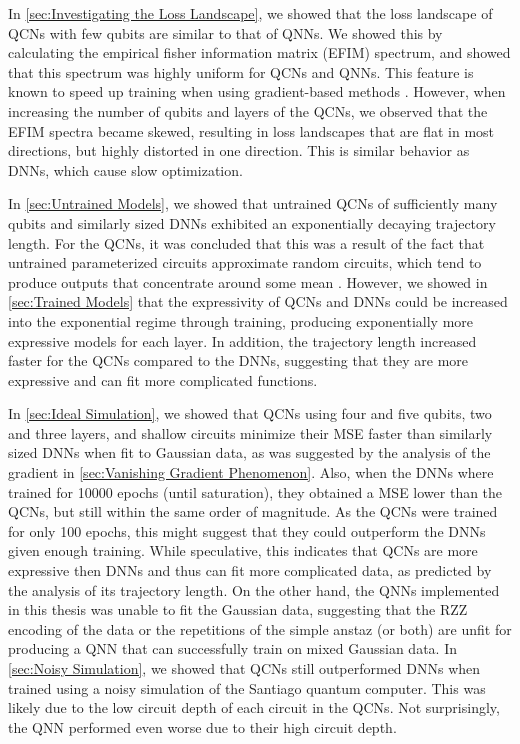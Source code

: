 In \cref{sec:Investigating the Loss Landscape}, we showed that the loss landscape of QCNs with few qubits are similar to that of QNNs. We showed this by calculating the empirical fisher information matrix (EFIM) spectrum, and showed that this spectrum was highly uniform for QCNs and QNNs. This feature is known to speed up training when using gradient-based methods \citet{karakida2019universal}. However, when increasing the number of qubits and layers of the QCNs, we observed that the EFIM spectra became skewed, resulting in loss landscapes that are flat in most directions, but highly distorted in one direction. This is similar behavior as DNNs, which cause slow optimization.

In \cref{sec:Untrained Models}, we showed that untrained QCNs of sufficiently many qubits and similarly sized DNNs exhibited an exponentially decaying trajectory length. For the QCNs, it was concluded that this was a result of the fact that untrained parameterized circuits approximate random circuits, which tend to produce outputs that concentrate around some mean \cite{McClean_2018}. However, we showed in \cref{sec:Trained Models} that the expressivity of QCNs and DNNs could be increased into the exponential regime through training, producing exponentially more expressive models for each layer. In addition, the trajectory length increased faster for the QCNs compared to the DNNs, suggesting that they are more expressive and can fit more complicated functions.

In \cref{sec:Ideal Simulation}, we showed that QCNs using four and five qubits, two and three layers, and shallow circuits minimize their MSE faster than similarly sized DNNs when fit to Gaussian data, as was suggested by the analysis of the gradient in \cref{sec:Vanishing Gradient Phenomenon}. Also, when the DNNs where trained for 10000 epochs (until saturation), they obtained a MSE lower than the QCNs, but still within the same order of magnitude. As the QCNs were trained for only 100 epochs, this might suggest that they could outperform the DNNs given enough training. While speculative, this indicates that QCNs are more expressive then DNNs and thus can fit more complicated data, as predicted by the analysis of its trajectory length. On the other hand, the QNNs implemented in this thesis was unable to fit the Gaussian data, suggesting that the RZZ encoding of the data or the repetitions of the simple anstaz (or both) are unfit for producing a QNN that can successfully train on mixed Gaussian data. In \cref{sec:Noisy Simulation}, we showed that QCNs still outperformed DNNs when trained using a noisy simulation of the Santiago quantum computer. This was likely due to the low circuit depth of each circuit in the QCNs. Not surprisingly, the QNN performed even worse due to their high circuit depth.   

